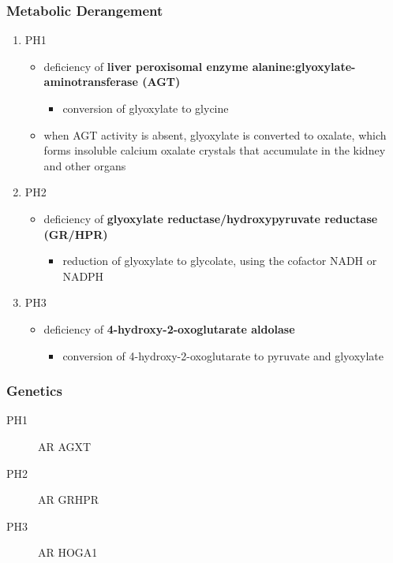 \documentclass[12pt]{scrartcl}
\begin{document}
\subsubsection{Metabolic Derangement}
\label{sec:org6674af8}
\begin{enumerate}
\item PH1
\label{sec:org865276c}
\begin{itemize}
\item deficiency of \textbf{liver peroxisomal enzyme alanine:glyoxylate-aminotransferase (AGT)}
\begin{itemize}
\item conversion of glyoxylate to glycine
\end{itemize}
\item when AGT activity is absent, glyoxylate is converted to oxalate,
which forms insoluble calcium oxalate crystals that accumulate in
the kidney and other organs
\end{itemize}
\item PH2
\label{sec:org3cfd18d}
\begin{itemize}
\item deficiency of  \textbf{glyoxylate reductase/hydroxypyruvate reductase (GR/HPR)}
\begin{itemize}
\item reduction of glyoxylate to glycolate, using the cofactor NADH or NADPH
\end{itemize}
\end{itemize}
\item PH3
\label{sec:org0caf50c}
\begin{itemize}
\item deficiency of \textbf{4-hydroxy-2-oxoglutarate aldolase}
\begin{itemize}
\item conversion of 4-hydroxy-2-oxoglutarate to pyruvate and glyoxylate
\end{itemize}
\end{itemize}
\end{enumerate}
\subsubsection{Genetics}
\label{sec:orgc34fbdb}
\begin{description}
\item[{PH1}] AR AGXT
\item[{PH2}] AR GRHPR
\item[{PH3}] AR HOGA1
\end{description}
\end{document}
